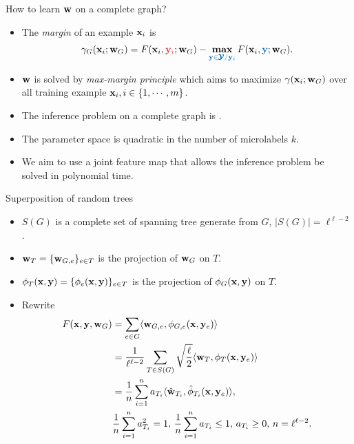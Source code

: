 \documentclass[first=dgreen,second=purple,logo=yellowexc]{aaltoslides}
\begin{document}
%
\begin{frame}{How to learn $\mathbf {w}$ on a complete graph?}
	\begin{itemize}\footnotesize
		\item The \textit{margin} of an example $\mathbf {x}_i$ is
		\begin{align*}
			\gamma_G(\vx_i;\vw_G) = F(\vx_i,{\color{aaltored} \vy_i};\vw_G) - \underset{{\color{aaltoblue}\vy\in\vYcal/\vy_i}}{\maximize}\,F(\vx_i,{\color{aaltoblue}\vy};\vw_G).
		\end{align*}
		\item $\mathbf {w}$ is solved by \textit{max-margin principle} which aims to maximize $\gamma(\mathbf {x}_i;\mathbf {w}_G)$ over all training example $\mathbf {x}_i,i\in\{1,\cdots,m\}$.
		\item The inference problem on a complete graph is \nphardness.
		\item The parameter space is quadratic in the number of microlabels $k$.
		\item We aim to use a joint feature map that allows the inference problem be solved in polynomial time.
	\end{itemize}
\end{frame}



%
\begin{frame}{Superposition of random trees}
	\begin{itemize}\footnotesize
		\item $S(G)$ is a complete set of spanning tree generate from $G$, $|S(G)| = \ell^{\ell-2}$.
		\item $\mathbf {w}_{T}=\{\mathbf {w}_{G,e}\}_{e\in T}$ is the projection of $\mathbf {w}_G$ on $T$.
		\item $\phi_T(\mathbf {x},\mathbf {y})=\{\phi_e(\mathbf {x},\mathbf {y})\}_{e\in T}$ is the projection of $\phi_G(\mathbf {x},\mathbf {y})$ on $T$.
		\item Rewrite
		\begin{align*}
			F(\mathbf {x},\mathbf {y},\mathbf {w}_G) &= \sum_{e\in G}\langle \mathbf {w}_{G,e}, \phi_{G,e}(\mathbf {x},\mathbf {y}_e) \rangle \\
			& = \frac{1}{\ell^{\ell-2}}\sum_{T\in S(G)}\sqrt{\frac{\ell}{2}}\langle \mathbf {w}_{T}, \phi_{T}(\mathbf {x},\mathbf {y}_e) \rangle\\
			& = \frac{1}{n}\sum_{i = 1}^{n}a_{T_i}\langle \hat{\mathbf {w}}_{T_i}, \hat{\phi}_{T_i}(\mathbf {x},\mathbf {y}_e) \rangle,\\
			& \frac{1}{n}\sum_{i = 1}^{n}a_{T_i}^2=1, \, \frac{1}{n}\sum_{i = 1}^{n}a_{T_i}\le1,\, a_{T_i}\ge0,\, n=\ell^{\ell-2}.
		\end{align*}
	\end{itemize}
\end{frame}
\end{document}
